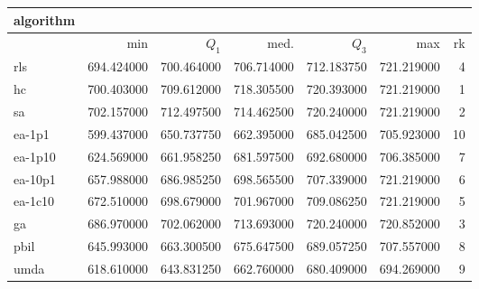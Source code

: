 \begin{tabular}{@{}l*{5}{>{{}}N{3}{2}}>{{}}N{2}{0}@{}}
\toprule
{algorithm} &  \\
\midrule
& {min} & {$Q_1$} & {med.} & {$Q_3$} & {max} & {rk}\\
\midrule
rls & 694.424000 & 700.464000 & 706.714000 & 712.183750 & {\color{blue}} 721.219000 & 4\\
hc & 700.403000 & 709.612000 & {\color{blue}} 718.305500 & {\color{blue}} 720.393000 & {\color{blue}} 721.219000 & 1\\
sa & {\color{blue}} 702.157000 & {\color{blue}} 712.497500 & 714.462500 & 720.240000 & {\color{blue}} 721.219000 & 2\\
ea-1p1 & 599.437000 & 650.737750 & 662.395000 & 685.042500 & 705.923000 & 10\\
ea-1p10 & 624.569000 & 661.958250 & 681.597500 & 692.680000 & 706.385000 & 7\\
ea-10p1 & 657.988000 & 686.985250 & 698.565500 & 707.339000 & {\color{blue}} 721.219000 & 6\\
ea-1c10 & 672.510000 & 698.679000 & 701.967000 & 709.086250 & {\color{blue}} 721.219000 & 5\\
ga & 686.970000 & 702.062000 & 713.693000 & 720.240000 & 720.852000 & 3\\
pbil & 645.993000 & 663.300500 & 675.647500 & 689.057250 & 707.557000 & 8\\
umda & 618.610000 & 643.831250 & 662.760000 & 680.409000 & 694.269000 & 9\\
\bottomrule
\end{tabular}
